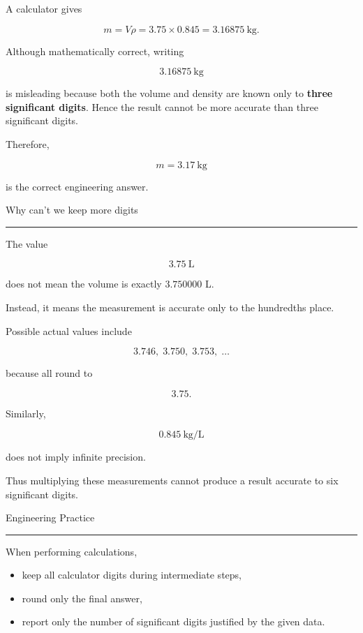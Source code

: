 \documentclass[12pt]{article}
\begin{document}
A calculator gives

\[
m=V\rho
=3.75\times0.845
=3.16875~\text{kg}.
\]

Although mathematically correct, writing

\[
3.16875~\text{kg}
\]

is misleading because both the volume and density are known only to
\textbf{three significant digits}. Hence the result cannot be more accurate
than three significant digits.

Therefore,

\[
\boxed{m=3.17~\text{kg}}
\]

is the correct engineering answer. 

\vspace{15pt}
{\headingfont\large Why can't we keep more digits}
\par
\vspace{4pt}
\hrule
\vspace{10pt}
The value

\[
3.75~\text{L}
\]

does not mean the volume is exactly \(3.750000\) L.

Instead, it means the measurement is accurate only to the hundredths place.

Possible actual values include

\[
3.746,\;
3.750,\;
3.753,\;
\ldots
\]

because all round to

\[
3.75.
\]

Similarly,

\[
0.845~\text{kg/L}
\]

does not imply infinite precision.

Thus multiplying these measurements cannot produce a result accurate to six
significant digits. 


\vspace{15pt}
{\headingfont\large Engineering Practice}
\par
\vspace{4pt}
\hrule
\vspace{10pt}

When performing calculations,

\begin{itemize}
\item keep all calculator digits during intermediate steps,
\item round only the final answer,
\item report only the number of significant digits justified by the given data.
\end{itemize}
\end{document}
